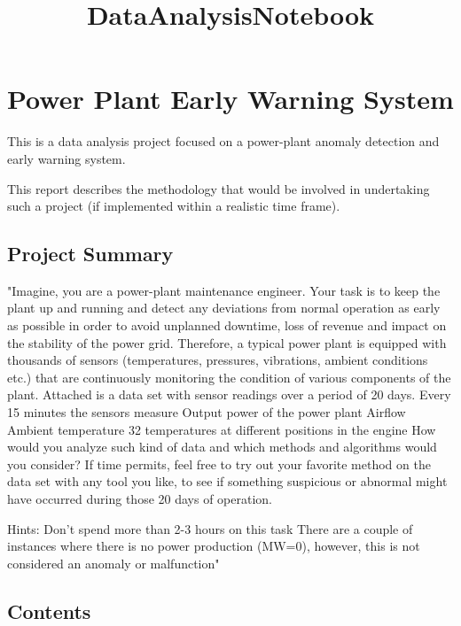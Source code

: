 \documentclass[11pt]{article}
\title{DataAnalysisNotebook}
\begin{document}
    
    
    \maketitle
    
    

    
    \section{Power Plant Early Warning
System}\label{power-plant-early-warning-system}

This is a data analysis project focused on a power-plant anomaly
detection and early warning system.

This report describes the methodology that would be involved in
undertaking such a project (if implemented within a realistic time
frame).

    \subsection{Project Summary}\label{project-summary}

"Imagine, you are a power-plant maintenance engineer. Your task is to
keep the plant up and running and detect any deviations from normal
operation as early as possible in order to avoid unplanned downtime,
loss of revenue and impact on the stability of the power grid.
Therefore, a typical power plant is equipped with thousands of sensors
(temperatures, pressures, vibrations, ambient conditions etc.) that are
continuously monitoring the condition of various components of the
plant. Attached is a data set with sensor readings over a period of 20
days. Every 15 minutes the sensors measure Output power of the power
plant Airflow Ambient temperature 32 temperatures at different positions
in the engine How would you analyze such kind of data and which methods
and algorithms would you consider? If time permits, feel free to try out
your favorite method on the data set with any tool you like, to see if
something suspicious or abnormal might have occurred during those 20
days of operation.

Hints: Don't spend more than 2-3 hours on this task There are a couple
of instances where there is no power production (MW=0), however, this is
not considered an anomaly or malfunction"

    \subsection{Contents}\label{contents}
\end{document}
